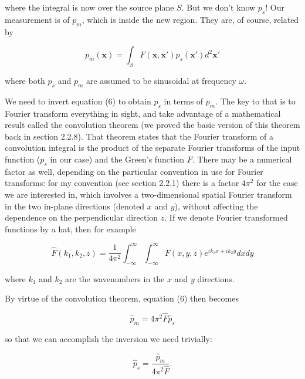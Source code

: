   \noindent{}where the integral is now over the source plane $S$. But we don't 
  know $p_s$! Our measurement is of $p_m$, which is inside the new region. They 
  are, of course, related by 

  \begin{equation*}p_m(\mathbf{x}) = \int_S{F(\mathbf{x},\mathbf{x'}) 
  p_s(\mathbf{x'}) d^2 \mathbf{x'}} \tag{6}\end{equation*} 

  \noindent{}where both $p_s$ and $p_m$ are assumed to be sinusoidal at 
  frequency $\omega$. 

  We need to invert equation (6) to obtain $p_s$ in terms of $p_m$. The key to 
  that is to Fourier transform everything in sight, and take advantage of a 
  mathematical result called the convolution theorem (we proved the basic 
  version of this theorem back in section 2.2.8). That theorem states that the 
  Fourier transform of a convolution integral is the product of the separate 
  Fourier transforms of the input function ($p_s$ in our case) and the Green's 
  function $F$. There may be a numerical factor as well, depending on the 
  particular convention in use for Fourier transforms: for my convention (see 
  section 2.2.1) there is a factor $4 \pi^2$ for the case we are interested in, 
  which involves a two-dimensional spatial Fourier transform in the two 
  in-plane directions (denoted $x$ and $y$), without affecting the dependence 
  on the perpendicular direction $z$. If we denote Fourier transformed 
  functions by a hat, then for example 

  \begin{equation*}\hat{F}(k_1,k_2,z)=\dfrac{1}{4 
  \pi^2}\int_{-\infty}^\infty{\int_{-\infty}^\infty{F(x,y,z)e^{i k_1 x+ik_2 y} 
  dx}dy} \tag{7}\end{equation*} 

  \noindent{}where $k_1$ and $k_2$ are the wavenumbers in the $x$ and $y$ 
  directions. 

  By virtue of the convolution theorem, equation (6) then becomes 

  \begin{equation*}\hat{p}_m=4 \pi^2 \hat{F} \hat{p}_s \tag{8}\end{equation*} 

  \noindent{}so that we can accomplish the inversion we need trivially: 

  \begin{equation*}\hat{p}_s=\dfrac{\hat{p}_m }{4 \pi^2 \hat{F}} . 
  \tag{9}\end{equation*} 

